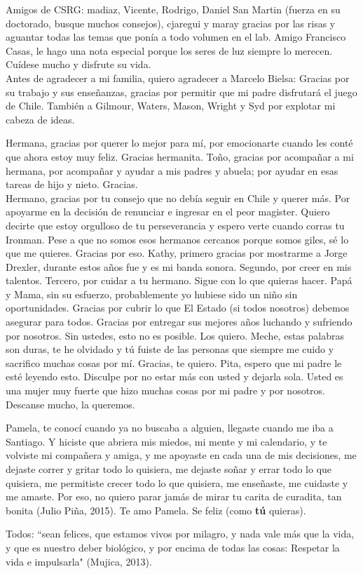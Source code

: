 Amigos de CSRG: madiaz, Vicente, Rodrigo, Daniel San Martin (fuerza en su doctorado, busque muchos consejos), cjaregui y maray gracias por las risas y aguantar todas las temas que ponía a todo volumen en el lab.
Amigo Francisco Casas, le hago una nota especial porque los seres de luz siempre lo merecen. Cuídese mucho y disfrute su vida.\\
Antes de agradecer a mi familia, quiero agradecer a Marcelo Bielsa: Gracias por su trabajo y sus enseñanzas, gracias por permitir que mi padre disfrutará el juego de Chile.
También a Gilmour, Waters, Mason, Wright y Syd por explotar mi cabeza de ideas.

Hermana, gracias por querer lo mejor para mí, por emocionarte cuando les conté que ahora estoy muy feliz. Gracias hermanita.
Toño, gracias por acompañar a mi hermana, por acompañar y ayudar a mis padres y abuela; por ayudar en esas tareas de hijo y nieto. Gracias.\\
Hermano, gracias por tu consejo que no debía seguir en Chile y querer más. Por apoyarme en la decisión de renunciar e ingresar en el peor magister. Quiero decirte que estoy orgulloso de tu perseverancia y espero verte cuando corras tu Ironman. Pese a que no somos esos hermanos cercanos porque somos giles, sé lo que me quieres. Gracias por eso.
Kathy, primero gracias por mostrarme a Jorge Drexler, durante estos años fue y es mi banda sonora. Segundo, por creer en mis talentos. Tercero, por cuidar a tu hermano. Sigue con lo que quieras hacer.
Papá y Mama, sin su esfuerzo, probablemente yo hubiese sido un niño sin oportunidades. Gracias por cubrir lo que El Estado (si todos nosotros) debemos asegurar para todos. 
Gracias por entregar sus mejores años luchando y sufriendo por nosotros. Sin ustedes, esto no es posible. Los quiero.
Meche, estas palabras son duras, te he olvidado y tú fuiste de las personas que siempre me cuido y sacrifico muchas cosas por mí. Gracias, te quiero.
Pita, espero que mi padre le esté leyendo esto. Disculpe por no estar más con usted y dejarla sola. Usted es una mujer muy fuerte que hizo muchas cosas por mi padre y por nosotros. Descanse mucho, la queremos.

Pamela, te conocí cuando ya no buscaba a alguien, llegaste cuando me iba a Santiago. 
Y hiciste que abriera mis miedos, mi mente y mi calendario, y te volviste mi compañera y amiga, y me apoyaste en cada una de mis decisiones, me dejaste correr y gritar todo lo quisiera, me dejaste soñar y errar todo lo que quisiera, me permitiste crecer todo lo que quisiera, me enseñaste, me cuidaste y me amaste. 
Por eso, no quiero parar jamás de mirar tu carita de curadita, tan bonita (Julio Piña, 2015). 
Te amo Pamela. Se feliz (como \textbf{tú} quieras). 


Todos: ``sean felices, que estamos vivos por milagro, y nada vale más que la vida, y que es nuestro deber biológico, y por encima de todas las cosas: Respetar la vida e impulsarla" (Mujica, 2013).



